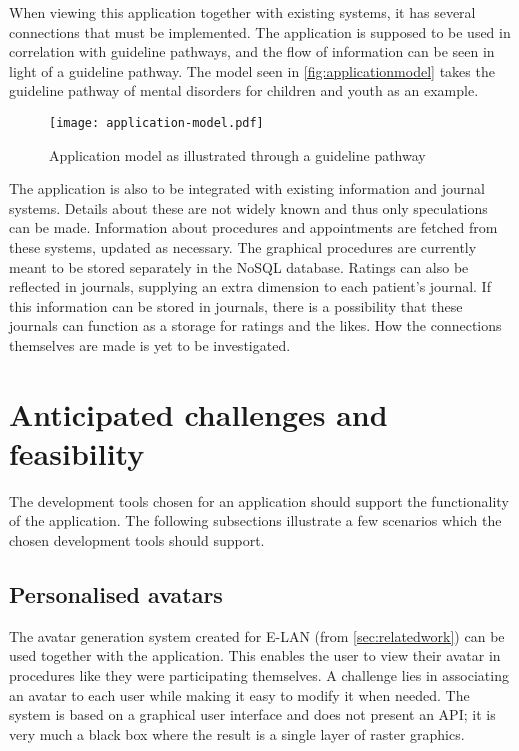 When viewing this application together with existing systems, it has several connections that must be implemented. The application is supposed to be used in correlation with guideline pathways, and the flow of information can be seen in light of a guideline pathway. The model seen in \autoref{fig:applicationmodel} takes the guideline pathway of mental disorders for children and youth \autocite{haugland2018} as an example.

\begin{figure}
    \centering
    \texttt{[image: application-model.pdf]}
    \caption{Application model as illustrated through a guideline pathway}
    \label{fig:applicationmodel}
\end{figure}

The application is also to be integrated with existing information and journal systems. Details about these are not widely known and thus only speculations can be made. Information about procedures and appointments are fetched from these systems, updated as necessary. The graphical procedures are currently meant to be stored separately in the NoSQL database. Ratings can also be reflected in journals, supplying an extra dimension to each patient's journal. If this information can be stored in journals, there is a possibility that these journals can function as a storage for ratings and the likes. How the connections themselves are made is yet to be investigated.

\section{Anticipated challenges and feasibility}
\label{sec:anticipatedchallenges}

The development tools chosen for an application should support the functionality of the application. The following subsections illustrate a few scenarios which the chosen development tools should support.

\subsection{Personalised avatars}

The avatar generation system created for E-LAN (from \autoref{sec:relatedwork}) can be used together with the application. This enables the user to view their avatar in procedures like they were participating themselves. A challenge lies in associating an avatar to each user while making it easy to modify it when needed. The system is based on a graphical user interface and does not present an API; it is very much a black box where the result is a single layer of raster graphics.

